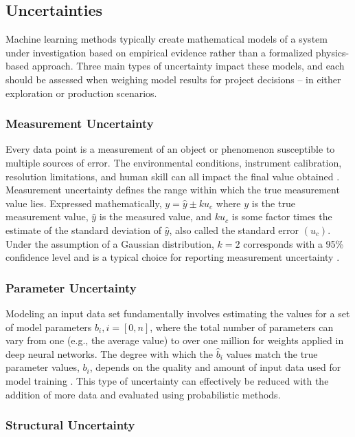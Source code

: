 \subsection{Uncertainties}

Machine learning methods typically create mathematical models of a system under investigation based on empirical evidence rather than a formalized physics-based approach. Three main types of uncertainty impact these models, and each should be assessed when weighing model results for project decisions – in either exploration or production scenarios. 

\subsubsection{Measurement Uncertainty}

Every data point is a measurement of an object or phenomenon susceptible to multiple sources of error. The environmental conditions, instrument calibration, resolution limitations, and human skill can all impact the final value obtained \citep[~p. 11-14]{baird_experimentation_1962}. Measurement uncertainty defines the range within which the true measurement value lies. Expressed mathematically, \(y=\hat{y} \pm ku_c\) where \(y\) is the true measurement value, \(\hat{y}\) is the measured value, and \(ku_c\) is some factor times the estimate of the standard deviation of \(\hat{y}\), also called the standard error \((u_c)\). Under the assumption of a Gaussian distribution, \(k=2\)  corresponds with a 95\% confidence level and is a typical choice for reporting measurement uncertainty \citep{nist_nist_2021}.

\subsubsection{Parameter Uncertainty}

Modeling an input data set fundamentally involves estimating the values for a set of model parameters \(b_i, i = [0, n]\), where the total number of parameters can vary from one (e.g., the average value) to over one million for weights applied in deep neural networks. The degree with which the \(\hat{b}_i\) values match the true parameter values, \(b_i\), depends on the quality and amount of input data used for model training \citep[~p. 81]{james_introduction_2013}. This type of uncertainty can effectively be reduced with the addition of more data and evaluated using probabilistic methods. 

\subsubsection{Structural Uncertainty}

